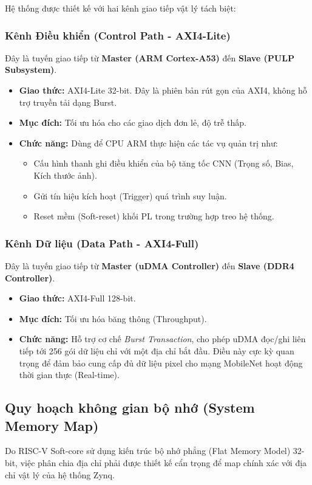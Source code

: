 Hệ thống được thiết kế với hai kênh giao tiếp vật lý tách biệt:

\subsubsection{Kênh Điều khiển (Control Path - AXI4-Lite)}
Đây là tuyến giao tiếp từ \textbf{Master (ARM Cortex-A53)} đến \textbf{Slave (PULP Subsystem)}.
\begin{itemize}
    \item \textbf{Giao thức:} AXI4-Lite 32-bit. Đây là phiên bản rút gọn của AXI4, không hỗ trợ truyền tải dạng Burst.
    \item \textbf{Mục đích:} Tối ưu hóa cho các giao dịch đơn lẻ, độ trễ thấp.
    \item \textbf{Chức năng:} Dùng để CPU ARM thực hiện các tác vụ quản trị như:
    \begin{itemize}
        \item Cấu hình thanh ghi điều khiển của bộ tăng tốc CNN (Trọng số, Bias, Kích thước ảnh).
        \item Gửi tín hiệu kích hoạt (Trigger) quá trình suy luận.
        \item Reset mềm (Soft-reset) khối PL trong trường hợp treo hệ thống.
    \end{itemize}
\end{itemize}

\subsubsection{Kênh Dữ liệu (Data Path - AXI4-Full)}
Đây là tuyến giao tiếp từ \textbf{Master (uDMA Controller)} đến \textbf{Slave (DDR4 Controller)}.
\begin{itemize}
    \item \textbf{Giao thức:} AXI4-Full 128-bit.
    \item \textbf{Mục đích:} Tối ưu hóa băng thông (Throughput).
    \item \textbf{Chức năng:} Hỗ trợ cơ chế \textit{Burst Transaction}, cho phép uDMA đọc/ghi liên tiếp tới 256 gói dữ liệu chỉ với một địa chỉ bắt đầu. Điều này cực kỳ quan trọng để đảm bảo cung cấp đủ dữ liệu pixel cho mạng MobileNet hoạt động thời gian thực (Real-time).
\end{itemize}

\subsection{Quy hoạch không gian bộ nhớ (System Memory Map)}
Do RISC-V Soft-core sử dụng kiến trúc bộ nhớ phẳng (Flat Memory Model) 32-bit, việc phân chia địa chỉ phải được thiết kế cẩn trọng để map chính xác với địa chỉ vật lý của hệ thống Zynq.

